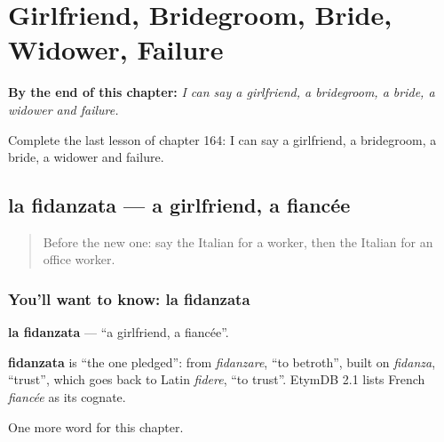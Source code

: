 
\chapter{Girlfriend, Bridegroom, Bride, Widower, Failure}
\label{ch:it-girlfriend-bridegroom-bride-widower-failure}

\begin{chapteropening}
\textbf{By the end of this chapter:} \emph{I can say a girlfriend, a bridegroom, a bride, a widower and failure.}

Complete the last lesson of chapter 164: I can say a girlfriend, a bridegroom, a bride, a widower and failure.
\end{chapteropening}

\section[la fidanzata]{la fidanzata — a girlfriend, a fiancée}

\label{lesson:IT-C164-fidanzata}



\begin{quote}
Before the new one: say the Italian for a worker, then the Italian for an office worker.
\end{quote}

\subsection*{You'll want to know: la fidanzata}
\textbf{la fidanzata} — \textquotedblleft{}a girlfriend, a fiancée\textquotedblright{}.

\begin{cousinweb}
\textbf{fidanzata} is \textquotedblleft{}the one pledged\textquotedblright{}: from \emph{fidanzare}, \textquotedblleft{}to betroth\textquotedblright{}, built on \emph{fidanza}, \textquotedblleft{}trust\textquotedblright{}, which goes back to Latin \emph{fidere}, \textquotedblleft{}to trust\textquotedblright{}. EtymDB 2.1 lists French \emph{fiancée} as its cognate.
\end{cousinweb}

\begin{grammarlens}[title={What you've built}]
One more word for this chapter.
\end{grammarlens}

